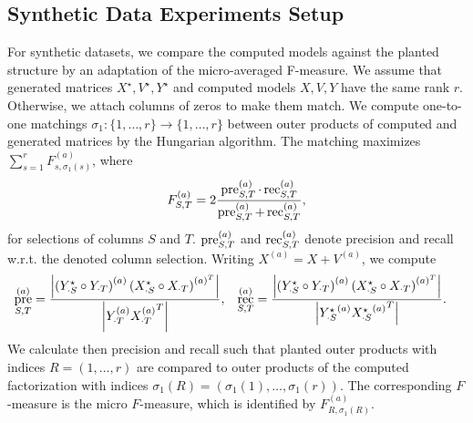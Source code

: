 \subsection{Synthetic Data Experiments Setup}
For synthetic datasets, we compare the computed models against the planted structure by an adaptation of the micro-averaged F-measure.
We assume that generated matrices  $X^\star,V^\star,Y^\star$ and computed models $X,V,Y$ have the same rank $r$. Otherwise, we attach columns of zeros to make them match.
We compute one-to-one matchings $\sigma_1:\{1,\ldots, r\}\rightarrow \{1,\ldots,r\}$ between outer products of computed and generated matrices by the Hungarian algorithm. The matching maximizes $\sum_{s=1}^rF^{(a)}_{s,\sigma_1(s)}$, where 
\[
	F^{(a)}_{S,T}=2\frac{\operatorname*{pre}^{(a)}_{S,T}\cdot\operatorname*{rec}^{(a)}_{S,T}}{\operatorname*{pre}^{(a)}_{S,T}+\operatorname*{rec}^{(a)}_{S,T}},
\]
for selections of columns $S$ and $T$. $\operatorname*{pre}^{(a)}_{S,T}$ and $\operatorname*{rec}^{(a)}_{S,T}$ denote precision and recall w.r.t. the denoted column selection. Writing $X^{(a)}=X+V^{(a)}$, we compute
\begin{align*}
	\operatorname*{pre}^{(a)}_{S,T} &= \frac{\left|\left({Y^\star_{\cdot S}}\circ Y_{\cdot T}\right)^{(a)}\left({X^\star_{\cdot S}}\circ X_{\cdot T}\right)^{(a)^T}\right|}{\left|Y^{(a)}_{\cdot T}{X^{(a)}_{\cdot T}}^T\right|}, &
    \operatorname*{rec}^{(a)}_{S,T} &= \frac{\left|\left({Y^\star_{\cdot S}}\circ Y_{\cdot T}\right)^{(a)}\left({X^\star_{\cdot S}}\circ X_{\cdot T}\right)^{(a)^T}\right|}{\left|{Y^\star_{\cdot S}}^{(a)}{{X^\star_{\cdot S}}^{(a)}}^T\right|}.
\end{align*}
We calculate then precision and recall such that planted outer products with indices $R=(1,\ldots, r)$ are compared to outer products of the computed factorization with indices $\sigma_1(R)=(\sigma_1(1),\ldots,\sigma_1(r))$. The corresponding $F$-measure is the micro $F$-measure, which is identified by $F^{(a)}_{R,\sigma_1(R)}$.

